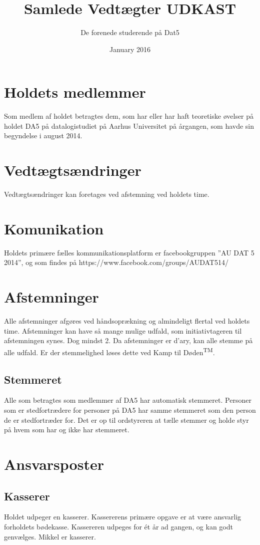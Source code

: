 \documentclass{article}
\title{Samlede Vedtægter UDKAST}
\author{De forenede studerende på Dat5}
\date{January 2016}
\begin{document}
\maketitle

\section{Holdets medlemmer}
Som medlem af holdet betragtes dem, som har eller har haft teoretiske øvelser på holdet DA5 på datalogistudiet på Aarhus Universitet på årgangen, som havde sin begyndelse i august 2014.

\section{Vedtægtsændringer}
Vedtægtsændringer kan foretages ved afstemning ved holdets time.

\section{Komunikation}
Holdets primære fælles kommunikationsplatform er facebookgruppen ”AU DAT 5 2014”, og som findes på https://www.facebook.com/groups/AUDAT514/

\section{Afstemninger}
Alle afstemninger afgøres ved håndsoprækning og almindeligt flertal ved holdets time. Afstemninger kan have så mange mulige udfald, som initiativtageren til afstemningen synes. Dog mindst 2. Da afstemninger er d'ary, kan alle stemme på alle udfald. Er der stemmelighed løses dette ved Kamp til Døden\textsuperscript{TM}.
\subsection{Stemmeret}
Alle som betragtes som medlemmer af DA5 har automatisk stemmeret. Personer som er stedfortrædere for personer på DA5 har samme stemmeret som den person de er stedfortræder for. Det er op til ordstyreren at tælle stemmer og holde styr på hvem som har og ikke har stemmeret.

\section{Ansvarsposter}
\subsection{Kasserer}
Holdet udpeger en kasserer. Kassererens primære opgave er at være ansvarlig forholdets bødekasse. Kassereren udpeges for ét år ad gangen, og kan godt genvælges. Mikkel er kasserer.
\end{document}
